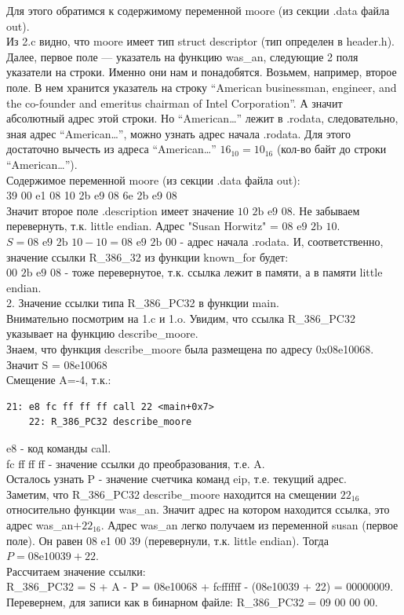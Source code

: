 \documentclass[12pt, letterpaper]{article}
\begin{document}
Для этого обратимся к содержимому переменной  moore (из секции .data файла out).\\

Из 2.c видно, что moore имеет тип struct descriptor (тип определен в header.h). Далее, первое поле — указатель на функцию was\_an, следующие 2 поля указатели на строки. Именно они нам и понадобятся. Возьмем, например, второе поле. В нем хранится указатель на строку ``American businessman, engineer, and the co-founder and emeritus chairman of Intel Corporation''. А значит абсолютный адрес этой строки. Но ``American\dots'' лежит в .rodata, следовательно, зная адрес ``American\dots'', можно узнать адрес начала .rodata. Для этого достаточно вычесть из адреса ``American\dots'' $16_{10} = 10_{16}$ (кол-во байт до строки ``American\dots'').\\
Содержимое переменной moore (из секции .data файла out):\\
39 00 e1 08 10 2b e9 08 6e 2b e9 08\\
Значит второе поле .description имеет значение $\text{10 2b e9 08}$. Не забываем перевернуть, т.к. little endian. Адрес "Susan Horwitz" = $\text{08 e9 2b 10}$.\\
$S = \text{08 e9 2b 10} - 10 = \text{08 e9 2b 00}$ - адрес начала .rodata. И, соответственно, значение ссылки R\_386\_32 из функции known\_for будет:\\ $\text{00 2b e9 08}$ - тоже перевернутое, т.к. ссылка лежит в памяти, а в памяти little endian.\\

2. Значение ссылки типа R\_386\_PC32 в функции main.\\

Внимательно посмотрим на 1.c и 1.o. Увидим, что ссылка R\_386\_PC32 указывает на функцию describe\_moore.\\
Знаем, что функция describe\_moore была размещена по адресу 0x08e10068. Значит S = 08e10068\\
Смещение A=-4, т.к.:\\
\begin{verbatim}
21: e8 fc ff ff ff call 22 <main+0x7>
    22: R_386_PC32 describe_moore
\end{verbatim}
e8 - код команды call.\\ fc ff ff ff - значение ссылки до преобразования, т.е. A.\\
Осталось узнать P - значение счетчика команд eip, т.е. текущий адрес.\\

Заметим, что R\_386\_PC32 describe\_moore находится на смещении $22_{16}$ относительно функции was\_an. Значит адрес на котором находится ссылка, это адрес was\_an$+22_{16}$. Адрес was\_an легко получаем из переменной susan (первое поле). Он равен 08 e1 00 39 (перевернули, т.к. little endian). Тогда $P=\text{08e10039}+22$.\\
Рассчитаем значение ссылки:\\
R\_386\_PC32 = S + A - P = 08e10068 + fcffffff - (08e10039 + 22) = 00000009.\\ Перевернем, для записи как в бинарном файле: R\_386\_PC32 = 09 00 00 00.\\
\end{document}
